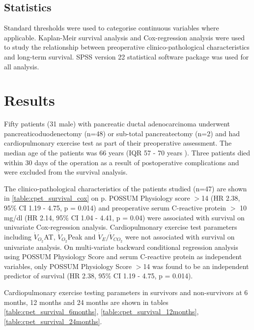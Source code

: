 \subsection{Statistics}
Standard thresholds were used to categorise continuous variables where applicable. Kaplan-Meir survival analysis and Cox-regression analysis were used to study the relationship between preoperative clinico-pathological characteristics and long-term survival. SPSS version 22 statistical software package was used for all analysis.



\section{Results}



Fifty patients (31 male) with pancreatic ductal adenocarcinoma underwent pancreaticoduodenectomy (n=48) or sub-total pancreatectomy (n=2) and had cardiopulmonary exercise test as part of their preoperative assessment. The median age of the patients was 66 years (IQR 57 - 70 years ). Three patients died within 30 days of the operation as a result of postoperative complications and were excluded from the survival analysis.

The clinico-pathological characteristics of the patients studied (n=47) are shown in \ref{table:cpet_survival_cox} on p\pageref{table:cpet_survival_cox}. POSSUM Physiology score $>$14 (HR 2.38, 95\% CI 1.19 - 4.75, p = 0.014) and preoperative serum C-reactive protein $>$ 10 mg/dl (HR 2.14, 95\% CI 1.04 - 4.41, p = 0.04) were associated with survival on univariate Cox-regression analysis. Cardiopulmonary exercise test parameters including $\dot{V}_{O_2}$AT, $\dot{V}_{O_2}$Peak and $\dot{V}_E/\dot{V}_{CO_2}$ were not associated with survival on univariate analysis.
On multi-variate backward conditional regression analysis using POSSUM Physiology Score and serum C-reactive protein as independent variables, only POSSUM Physiology Score $>$14  was found to be an independent predictor of survival (HR 2.38, 95\% CI 1.19 - 4.75, p = 0.014).


Cardiopulmonary exercise testing parameters in survivors and non-survivors at 6 months, 12 months and 24 months are shown in tables \ref{table:cpet_survival_6months}, \ref{table:cpet_survival_12months}, \ref{table:cpet_survival_24months}.

